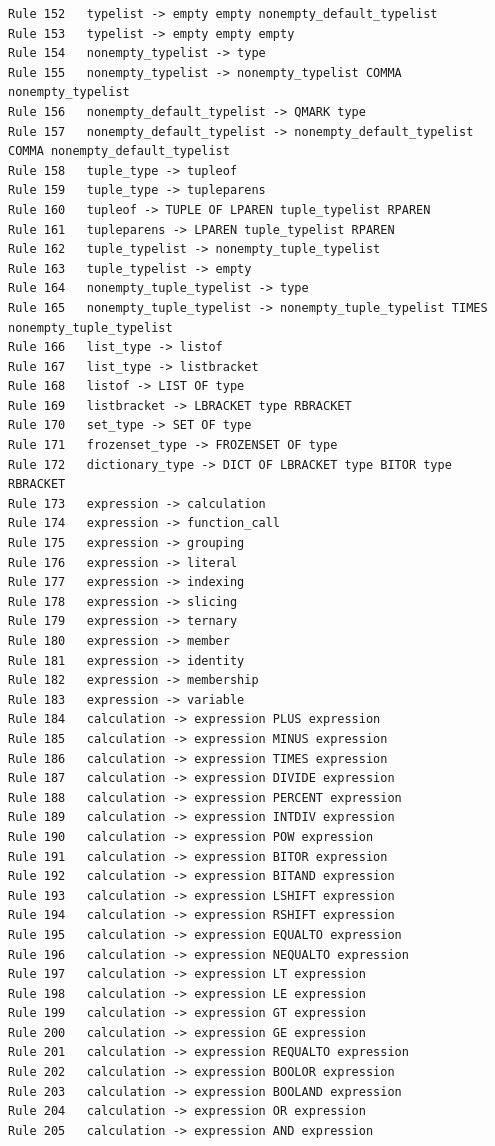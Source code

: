 \documentclass{article}
\begin{document}
\begin{verbatim}
Rule 152   typelist -> empty empty nonempty_default_typelist
Rule 153   typelist -> empty empty empty
Rule 154   nonempty_typelist -> type
Rule 155   nonempty_typelist -> nonempty_typelist COMMA nonempty_typelist
Rule 156   nonempty_default_typelist -> QMARK type
Rule 157   nonempty_default_typelist -> nonempty_default_typelist COMMA nonempty_default_typelist
Rule 158   tuple_type -> tupleof
Rule 159   tuple_type -> tupleparens
Rule 160   tupleof -> TUPLE OF LPAREN tuple_typelist RPAREN
Rule 161   tupleparens -> LPAREN tuple_typelist RPAREN
Rule 162   tuple_typelist -> nonempty_tuple_typelist
Rule 163   tuple_typelist -> empty
Rule 164   nonempty_tuple_typelist -> type
Rule 165   nonempty_tuple_typelist -> nonempty_tuple_typelist TIMES nonempty_tuple_typelist
Rule 166   list_type -> listof
Rule 167   list_type -> listbracket
Rule 168   listof -> LIST OF type
Rule 169   listbracket -> LBRACKET type RBRACKET
Rule 170   set_type -> SET OF type
Rule 171   frozenset_type -> FROZENSET OF type
Rule 172   dictionary_type -> DICT OF LBRACKET type BITOR type RBRACKET
Rule 173   expression -> calculation
Rule 174   expression -> function_call
Rule 175   expression -> grouping
Rule 176   expression -> literal
Rule 177   expression -> indexing
Rule 178   expression -> slicing
Rule 179   expression -> ternary
Rule 180   expression -> member
Rule 181   expression -> identity
Rule 182   expression -> membership
Rule 183   expression -> variable
Rule 184   calculation -> expression PLUS expression
Rule 185   calculation -> expression MINUS expression
Rule 186   calculation -> expression TIMES expression
Rule 187   calculation -> expression DIVIDE expression
Rule 188   calculation -> expression PERCENT expression
Rule 189   calculation -> expression INTDIV expression
Rule 190   calculation -> expression POW expression
Rule 191   calculation -> expression BITOR expression
Rule 192   calculation -> expression BITAND expression
Rule 193   calculation -> expression LSHIFT expression
Rule 194   calculation -> expression RSHIFT expression
Rule 195   calculation -> expression EQUALTO expression
Rule 196   calculation -> expression NEQUALTO expression
Rule 197   calculation -> expression LT expression
Rule 198   calculation -> expression LE expression
Rule 199   calculation -> expression GT expression
Rule 200   calculation -> expression GE expression
Rule 201   calculation -> expression REQUALTO expression
Rule 202   calculation -> expression BOOLOR expression
Rule 203   calculation -> expression BOOLAND expression
Rule 204   calculation -> expression OR expression
Rule 205   calculation -> expression AND expression

\end{verbatim}
\end{document}
